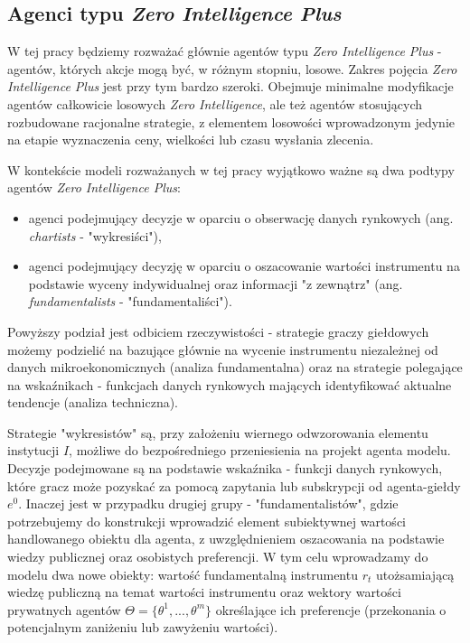 {\subsection{Agenci typu \textit{Zero Intelligence Plus}}\label{sec:ziplus}
W tej pracy będziemy rozważać głównie agentów typu \textit{Zero Intelligence Plus} - agentów, których akcje mogą być, w różnym stopniu, losowe. Zakres pojęcia \textit{Zero Intelligence Plus} jest przy tym bardzo szeroki. Obejmuje minimalne modyfikacje agentów całkowicie losowych \textit{Zero Intelligence}, ale też agentów stosujących rozbudowane racjonalne strategie, z elementem losowości wprowadzonym jedynie na etapie wyznaczenia ceny, wielkości lub czasu wysłania zlecenia\cite{abides_explanation}.

W kontekście modeli rozważanych w tej pracy wyjątkowo ważne są dwa podtypy agentów \textit{Zero Intelligence Plus}\cite{lux}:
\begin{itemize}
\item agenci podejmujący decyzje w oparciu o obserwację danych rynkowych (ang. \textit{chartists} - "wykresiści"),
\item agenci podejmujący decyzję w oparciu o oszacowanie wartości instrumentu na podstawie wyceny indywidualnej oraz informacji "z zewnątrz" (ang. \textit{fundamentalists} - "fundamentaliści").
\end{itemize}
Powyższy podział jest odbiciem rzeczywistości - strategie graczy giełdowych możemy podzielić na bazujące głównie na wycenie instrumentu niezależnej od danych mikroekonomicznych (analiza fundamentalna) oraz na strategie polegające na wskaźnikach - funkcjach danych rynkowych mających identyfikować aktualne tendencje (analiza techniczna). 

Strategie "wykresistów" są, przy założeniu wiernego odwzorowania elementu instytucji $I$, możliwe do bezpośredniego przeniesienia na projekt agenta modelu. Decyzje podejmowane są na podstawie wskaźnika - funkcji danych rynkowych, które gracz może pozyskać za pomocą zapytania lub subskrypcji od agenta-giełdy $e^0$. Inaczej jest w przypadku drugiej grupy - "fundamentalistów", gdzie potrzebujemy do konstrukcji wprowadzić element subiektywnej wartości handlowanego obiektu dla agenta, z uwzględnieniem oszacowania na podstawie wiedzy publicznej oraz osobistych preferencji. W tym celu wprowadzamy do modelu dwa nowe obiekty: wartość fundamentalną instrumentu $r_t$ utożsamiającą wiedzę publiczną na temat wartości instrumentu oraz wektory wartości prywatnych agentów $\Theta = \{\theta^1, ..., \theta^m\}$ określające ich preferencje (przekonania o potencjalnym zaniżeniu lub zawyżeniu wartości). 
}
